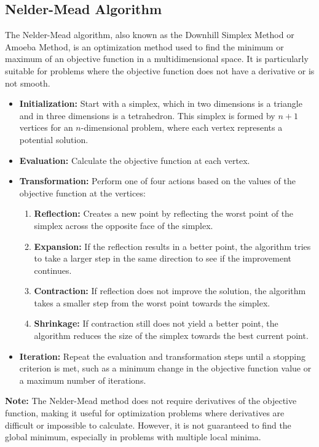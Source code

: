 \documentclass[12pt]{article} %
\begin{document}
\subsection{Nelder-Mead Algorithm}
The Nelder-Mead algorithm, also known as the Downhill Simplex Method or Amoeba Method, is an optimization method used to find the minimum or maximum of an objective function in a multidimensional space. It is particularly suitable for problems where the objective function does not have a derivative or is not smooth.
\begin{itemize}
    \item \textbf{Initialization:} Start with a simplex, which in two dimensions is a triangle and in three dimensions is a tetrahedron. This simplex is formed by $n+1$ vertices for an $n$-dimensional problem, where each vertex represents a potential solution.
    \item \textbf{Evaluation:} Calculate the objective function at each vertex.
    \item \textbf{Transformation:} Perform one of four actions based on the values of the objective function at the vertices:
    \begin{enumerate}
        \item \textbf{Reflection:} Creates a new point by reflecting the worst point of the simplex across the opposite face of the simplex.
        \item \textbf{Expansion:} If the reflection results in a better point, the algorithm tries to take a larger step in the same direction to see if the improvement continues.
        \item \textbf{Contraction:} If reflection does not improve the solution, the algorithm takes a smaller step from the worst point towards the simplex.
        \item \textbf{Shrinkage:} If contraction still does not yield a better point, the algorithm reduces the size of the simplex towards the best current point.
    \end{enumerate}
    \item \textbf{Iteration:} Repeat the evaluation and transformation steps until a stopping criterion is met, such as a minimum change in the objective function value or a maximum number of iterations.
\end{itemize}

\textbf{Note:} The Nelder-Mead method does not require derivatives of the objective function, making it useful for optimization problems where derivatives are difficult or impossible to calculate. However, it is not guaranteed to find the global minimum, especially in problems with multiple local minima.
\end{document}
